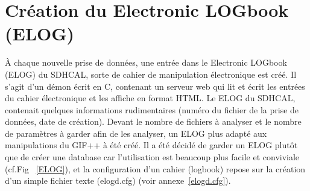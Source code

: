 \vspace*{-0.2cm}
\section{Création du Electronic LOGbook (ELOG)}
\vspace*{-0.4cm}
À chaque nouvelle prise de données, une entrée dans le Electronic LOGbook (ELOG) \cite{ELOG} du SDHCAL, sorte de cahier de manipulation électronique est créé. Il s'agit d'un démon écrit en C, contenant un serveur web qui lit et écrit les entrées du cahier électronique et les affiche en format HTML. Le ELOG du SDHCAL, contenait quelques informations rudimentaires (numéro du fichier de la prise de données, date de création). Devant le nombre de fichiers à analyser et le nombre de paramètres à garder afin de les analyser, un ELOG plus adapté aux manipulations du GIF++ à été créé. Il a été décidé de garder un ELOG plutôt que de créer une database car l'utilisation est beaucoup plus facile et conviviale (cf.Fig~ \ref{ELOG}), et la configuration d'un cahier (logbook) repose sur la création d'un simple fichier texte (elogd.cfg) (voir annexe~\ref{elogd.cfg}). 

